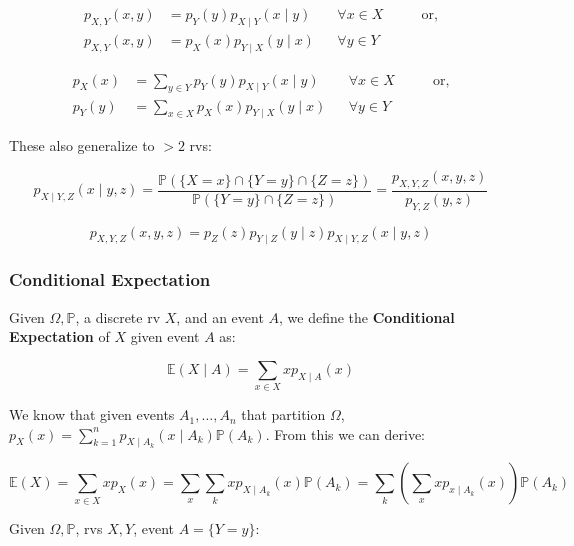\documentclass{article}
\begin{document}
\begin{equation}
  \tag{Product Rule of Sorts}
  \boxed{
    \begin{aligned}
      p_{X,Y}(x,y)
      &= p_Y(y) p_{X\mid Y}(x\mid y)
      && \forall x \in X
      &&& \text{ or,} \\
      p_{X,Y}(x,y)
      &= p_X(x) p_{Y\mid X}(y\mid x)
      && \forall y \in Y
    \end{aligned}
  }
\end{equation}

\begin{equation}
  \tag{Total-Prob Rule of Sorts}
  \boxed{
    \begin{aligned}
      p_X(x)
      &= \sum_{y \in Y} p_Y(y) p_{X\mid Y}(x \mid y)
      && \forall x \in X
      &&& \text{ or,} \\
      p_Y(y)
      &= \sum_{x \in X} p_X(x) p_{Y \mid X} (y\mid x)
      && \forall y \in Y
    \end{aligned}
  }
\end{equation}

These also generalize to $> 2$ rvs:

\[
  p_{X\mid Y,Z}(x\mid y,z) = \frac{\mathbb{P}(\{X=x\} \cap \{Y=y\}
    \cap \{Z = z\})} {\mathbb{P}(\{Y=y\} \cap \{Z=z\})} =
  \frac{p_{X,Y,Z} (x,y,z)} {p_{Y,Z}(y,z)}
\]

\[
  p_{X,Y,Z}(x,y,z) = p_Z(z) p_{Y \mid Z}(y\mid z) p_{X\mid Y,Z} (x
  \mid y,z)
\]

\subsubsection{Conditional Expectation}

Given $\Omega, \mathbb{P}$, a discrete rv $X$, and an event $A$, we
define the \textbf{Conditional Expectation} of $X$ given event $A$ as:

\begin{equation}
  \tag{Conditional Expectation}
  \boxed{
    \mathbb{E}(X \mid A) = \sum_{x\in X} xp_{X\mid A}(x)
  }
\end{equation}

We know that given events $A_1, \dots, A_n$ that partition $\Omega$,
$p_X(x) = \sum_{k=1}^n p_{X\mid A_k} (x\mid A_k)
\mathbb{P}(A_k)$. From this we can derive:

\[
  \mathbb{E}(X) = \sum_{x\in X} xp_X(x) = \sum_x \sum_k xp_{X\mid A_k}
  (x) \mathbb{P}(A_k) = \sum_k(\sum_x xp_{x\mid A_k}(x))
  \mathbb{P}(A_k)
\]

Given $\Omega, \mathbb{P}$, rvs $X,Y$, event $A = \{Y=y\}$:
\end{document}
